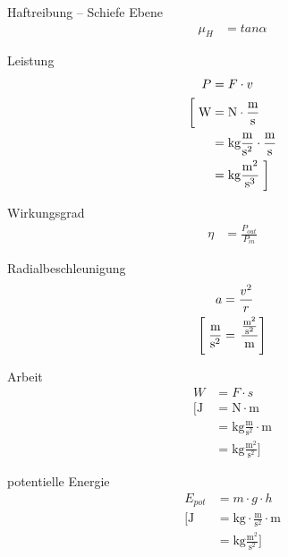 \documentclass[a8paper,9pt,print,grid=front]{kartei}
\begin{document}
\begin{karte}{Haftreibung -- Schiefe Ebene}
    \begin{align*}
        \mu_H &= tan \alpha
    \end{align*}
\end{karte}

\begin{karte}{Leistung}
    \begin{align*}
        P &= F \cdot v \\
        \left[ \vphantom{\frac{m^2}{s^3}} \right.
            \text{W} &= 
            \text{N} \cdot \frac{\text{m}}{\text{s}} \\
            &= \text{kg} \frac{\text{m}}{\text{s}^2} \cdot \frac{\text{m}}{\text{s}} \\
            &= \text{kg} \frac{\text{m}^2}{\text{s}^3} 
            \left. \vphantom{\frac{m^2}{s^3}} \right]
    \end{align*}
\end{karte}

\begin{karte}{Wirkungsgrad}
    \begin{align*}
        \eta &= \frac{P_{out}}{P_{in}}
    \end{align*}
\end{karte}

\begin{karte}{Radialbeschleunigung}
    \begin{align*}
        a &= \frac{v^2}{r} \\
        \left[ \vphantom{\frac{\frac{\text{m}^2}{\text{s}^2}}{\text{m}}} \right.
            \frac{\text{m}}{\text{s}^2} &= \left.  \frac{\frac{\text{m}^2}{\text{s}^2}}{\text{m}} 
             \right]
    \end{align*}
\end{karte}

\begin{karte}{Arbeit}
    \begin{align*}
        W &= F \cdot s \\
        \bigg[
            \text{J} &= \text{N} \cdot \text{m} \\
            &= \text{kg}\frac{\text{m}}{\text{s}^2} \cdot \text{m}\\
            &= \text{kg}\frac{\text{m}^2}{\text{s}^2}  
            \bigg]
    \end{align*}
\end{karte}

\begin{karte}{potentielle Energie}
    \begin{align*}
        E_{pot} &= m \cdot g \cdot h \\
        \bigg[
            \text{J} &= \text{kg} \cdot \frac{\text{m}}{\text{s}^2} \cdot \text{m} \\
            &= \text{kg}\frac{\text{m}^2}{\text{s}^2} 
            \bigg]
    \end{align*}
\end{karte}
\end{document}
